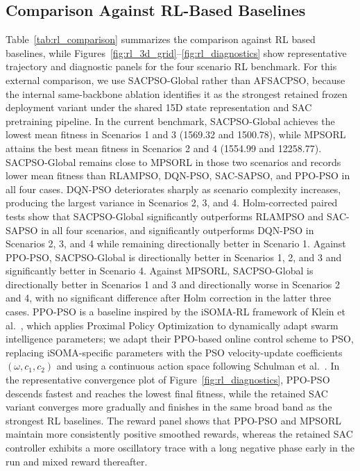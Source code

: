 \documentclass[final,5p,times]{elsarticle}
\begin{document}
\subsection{Comparison Against RL-Based Baselines}
Table~\ref{tab:rl_comparison} summarizes the comparison against RL based baselines, while Figures~\ref{fig:rl_3d_grid}--\ref{fig:rl_diagnostics} show representative trajectory and diagnostic panels for the four scenario RL benchmark.
For this external comparison, we use SACPSO-Global rather than AFSACPSO, because the internal same-backbone ablation identifies it as the strongest retained frozen deployment variant under the shared 15D state representation and SAC pretraining pipeline.
In the current benchmark, SACPSO-Global achieves the lowest mean fitness in Scenarios 1 and 3 (1569.32 and 1500.78), while MPSORL attains the best mean fitness in Scenarios 2 and 4 (1554.99 and 12258.77).
SACPSO-Global remains close to MPSORL in those two scenarios and records lower mean fitness than RLAMPSO, DQN-PSO, SAC-SAPSO, and PPO-PSO in all four cases.
DQN-PSO deteriorates sharply as scenario complexity increases, producing the largest variance in Scenarios 2, 3, and 4.
Holm-corrected paired tests show that SACPSO-Global significantly outperforms RLAMPSO and SAC-SAPSO in all four scenarios, and significantly outperforms DQN-PSO in Scenarios 2, 3, and 4 while remaining directionally better in Scenario 1.
Against PPO-PSO, SACPSO-Global is directionally better in Scenarios 1, 2, and 3 and significantly better in Scenario 4.
Against MPSORL, SACPSO-Global is directionally better in Scenarios 1 and 3 and directionally worse in Scenarios 2 and 4, with no significant difference after Holm correction in the latter three cases.
PPO-PSO is a baseline inspired by the iSOMA-RL framework of Klein et al.\ \cite{Klein2024Optimizing}, which applies Proximal Policy Optimization to dynamically adapt swarm intelligence parameters; we adapt their PPO-based online control scheme to PSO, replacing iSOMA-specific parameters with the PSO velocity-update coefficients $(\omega, c_1, c_2)$ and using a continuous action space following Schulman et al.\ \cite{Schulman2017Proximal}.
In the representative convergence plot of Figure~\ref{fig:rl_diagnostics}, PPO-PSO descends fastest and reaches the lowest final fitness, while the retained SAC variant converges more gradually and finishes in the same broad band as the strongest RL baselines.
The reward panel shows that PPO-PSO and MPSORL maintain more consistently positive smoothed rewards, whereas the retained SAC controller exhibits a more oscillatory trace with a long negative phase early in the run and mixed reward thereafter.
\end{document}
